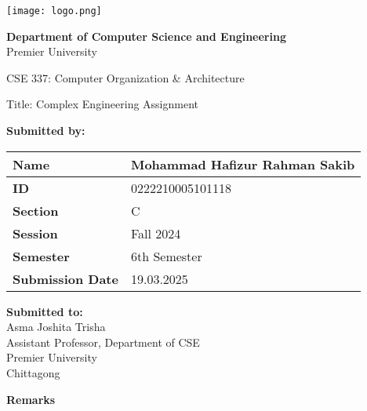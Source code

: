 \documentclass{scrreprt}
\renewcommand{\arraystretch}{1.5}
\begin{document}
\begin{titlepage}
    \centering
    \texttt{[image: logo.png]} %
    \vspace{1cm}

    \textbf{Department of Computer Science and Engineering}\\
    Premier University
    \vspace{1cm}

    \huge \textnormal{CSE 337: Computer Organization \& Architecture}
    \vspace{1in} %

    \Large \textnormal{Title: Complex Engineering Assignment}
    \vspace{0.5in} %

    \large
    \textbf{Submitted by:}
    \vspace{0.5cm}

    \renewcommand{\arraystretch}{1.5} %
    \begin{tabular}{|p{}|p{}|} %
        \hline
        \textbf{Name} & Mohammad Hafizur Rahman Sakib\\
        \hline
        \textbf{ID} & 0222210005101118 \\
        \hline
        \textbf{Section} & C \\
        \hline
        \textbf{Session} & Fall 2024 \\
        \hline
        \textbf{Semester} & 6th Semester \\
        \hline
        \textbf{Submission Date} & 19.03.2025 \\
        \hline
    \end{tabular}
    \vspace{1cm}

    \begin{minipage}[t]{0.48\textwidth}
        \textbf{Submitted to:}\\
        Asma Joshita Trisha\\
        Assistant Professor, Department of CSE\\
        Premier University\\
        Chittagong
    \end{minipage}%
    \hfill
    \begin{minipage}[t]{0.48\textwidth}
        \raggedleft
        \textbf{Remarks}\\
        \vspace{0.5cm} %
    \end{minipage}

    \date{\today}
    \vfill
\end{titlepage}
\end{document}
